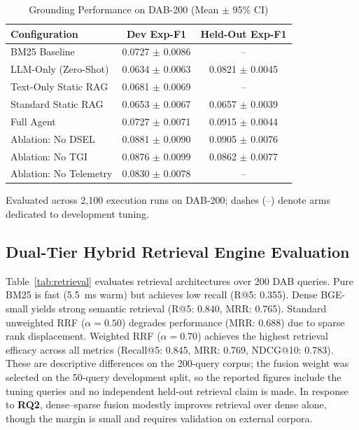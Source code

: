 \documentclass[conference]{IEEEtran}
\begin{document}
\begin{table}[ht]
\caption{Grounding Performance on DAB-200 (Mean $\pm$ 95\% CI)}
\label{tab:main}
\centering
\footnotesize
\setlength{\tabcolsep}{4pt}
\begin{tabular*}{\columnwidth}{@{\extracolsep{\fill}}lcc@{}}
\toprule
Configuration & Dev Exp-F1 & Held-Out Exp-F1 \\
\midrule
BM25 Baseline & 0.0727 $\pm$ 0.0086 & -- \\
LLM-Only (Zero-Shot) & 0.0634 $\pm$ 0.0063 & 0.0821 $\pm$ 0.0045 \\
Text-Only Static RAG & 0.0681 $\pm$ 0.0069 & -- \\
Standard Static RAG & 0.0653 $\pm$ 0.0067 & 0.0657 $\pm$ 0.0039 \\
Full Agent & 0.0727 $\pm$ 0.0071 & 0.0915 $\pm$ 0.0044 \\
\midrule
Ablation: No DSEL & 0.0881 $\pm$ 0.0090 & 0.0905 $\pm$ 0.0076 \\
Ablation: No TGI & 0.0876 $\pm$ 0.0099 & 0.0862 $\pm$ 0.0077 \\
Ablation: No Telemetry & 0.0830 $\pm$ 0.0078 & -- \\
\bottomrule
\end{tabular*}
\vspace{2pt}
\raggedright{\scriptsize Evaluated across 2,100 execution runs on DAB-200; dashes (--) denote arms dedicated to development tuning.}
\end{table}

\subsection{Dual-Tier Hybrid Retrieval Engine Evaluation}
Table~\ref{tab:retrieval} evaluates retrieval architectures over 200 DAB queries. Pure BM25 is fast (5.5~ms warm) but achieves low recall (R@5: 0.355). Dense BGE-small yields strong semantic retrieval (R@5: 0.840, MRR: 0.765). Standard unweighted RRF ($\alpha = 0.50$) degrades performance (MRR: 0.688) due to sparse rank displacement. Weighted RRF ($\alpha = 0.70$) achieves the highest retrieval efficacy across all metrics (Recall@5: 0.845, MRR: 0.769, NDCG@10: 0.783). These are descriptive differences on the 200-query corpus; the fusion weight was selected on the 50-query development split, so the reported figures include the tuning queries and no independent held-out retrieval claim is made. In response to \textbf{RQ2}, dense--sparse fusion modestly improves retrieval over dense alone, though the margin is small and requires validation on external corpora.
\end{document}

